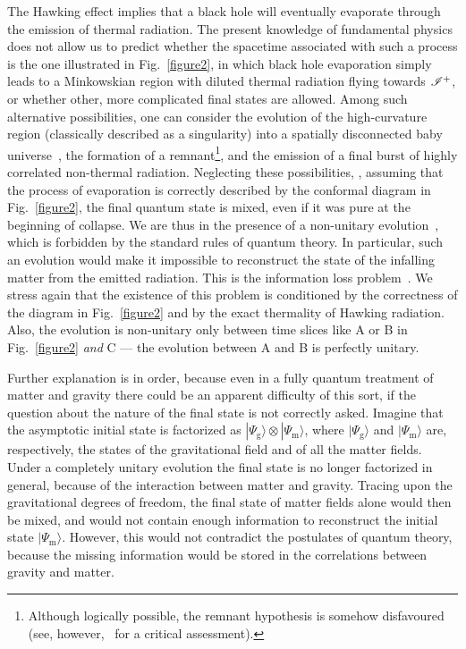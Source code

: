 \documentclass[groupedaddress, showpacs, showkeys, onecolumn, nofootinbib, 12pt]{revtex4}
\begin{document}
The Hawking effect implies that a black hole will eventually evaporate through the emission of thermal radiation.  The present knowledge of fundamental physics does not allow us to predict whether the spacetime associated with such a process is the one illustrated in Fig.~\ref{figure2}, in which black hole evaporation simply leads to a Minkowskian region with diluted thermal radiation flying towards $\mathscr{I}^+$, or whether other, more complicated final states are allowed.  Among such alternative possibilities, one can consider the evolution of the high-curvature region (classically described as a singularity) into a spatially disconnected baby universe~\cite{ted-valdivia}, the formation of a remnant\footnote{Although logically possible, the remnant hypothesis is somehow disfavoured~\cite{Giddings:1992hh, Giddings:1993km, Giddings:1993vj} (see, however,~\cite{Hossenfelder:2009xq} for a critical assessment).}, and the emission of a final burst of highly correlated non-thermal radiation.  Neglecting these possibilities, \ie, assuming that the process of evaporation is correctly described by the conformal diagram in Fig.~\ref{figure2}, the final quantum state is mixed, even if it was pure at the beginning of collapse.  We are thus in the presence of a  non-unitary evolution~\cite{Hawking:1976ra, Hawking:1982dj}, which is forbidden by the standard rules of quantum theory.   In particular, such an evolution would make it impossible to reconstruct the state of the infalling matter from the emitted radiation.  This is the information loss problem~\cite{Page:1993up, Giddings:1994zs}.  We stress again that the existence of this problem is conditioned by the correctness of the diagram in Fig.~\ref{figure2} and by the exact thermality of Hawking radiation.  Also, the evolution is non-unitary only between time slices like A or B in Fig.~\ref{figure2} {\em and\/} C --- the evolution between A and B is perfectly unitary.

Further explanation is in order, because even in a fully quantum treatment of matter and gravity there could be an apparent difficulty of this sort, if the question about the nature of the final state is not correctly asked.  Imagine that the asymptotic initial state is factorized as $|\Psi_\mathrm{g}\rangle\otimes |\Psi_\mathrm{m}\rangle$, where $|\Psi_\mathrm{g}\rangle$ and $|\Psi_\mathrm{m}\rangle$ are, respectively, the states of the gravitational field and of all the matter fields.  Under a completely unitary evolution the final state is no longer factorized in general, because of the interaction  between matter and gravity.  Tracing upon the gravitational degrees of freedom, the final state of matter fields alone would then be mixed, and would not contain enough information to reconstruct the initial state $|\Psi_\mathrm{m}\rangle$.  However, this would not contradict the postulates of quantum theory, because the missing information would be stored in the correlations between gravity and matter.
\end{document}
